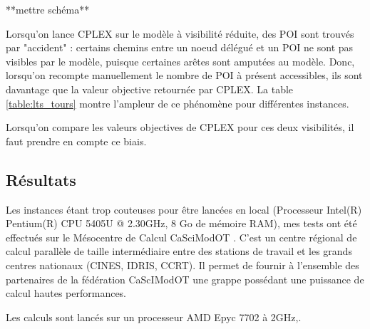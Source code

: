 \documentclass[a4paper,12pt,twoside,french]{article}
\begin{document}
**mettre schéma**

Lorsqu'on lance CPLEX sur le modèle à visibilité réduite, des POI sont trouvés par "accident" : certains chemins entre un noeud délégué et un POI ne sont pas visibles par le modèle, puisque certaines arêtes sont amputées au modèle. Donc, lorsqu'on recompte manuellement le nombre de POI à présent accessibles, ils sont davantage que la valeur objective retournée par CPLEX. La table \ref{table:lts_tours} montre l'ampleur de ce phénomène pour différentes instances.

Lorsqu'on compare les valeurs objectives de CPLEX pour ces deux visibilités, il faut prendre en compte ce biais.

\subsection{Résultats}

Les instances étant trop couteuses pour être lancées en local (Processeur Intel(R) Pentium(R) CPU 5405U @ 2.30GHz, 8 Go de mémoire RAM), mes tests ont été effectués sur le Mésocentre de Calcul CaSciModOT \cite{cas}. C'est un centre régional de calcul parallèle de taille intermédiaire entre des stations de travail et les grands centres nationaux (CINES, IDRIS, CCRT). Il permet de fournir à l'ensemble des partenaires de la fédération CaScIModOT une grappe possédant une puissance de calcul hautes performances.

Les calculs sont lancés sur un processeur AMD Epyc 7702 à 2GHz,.
\end{document}
